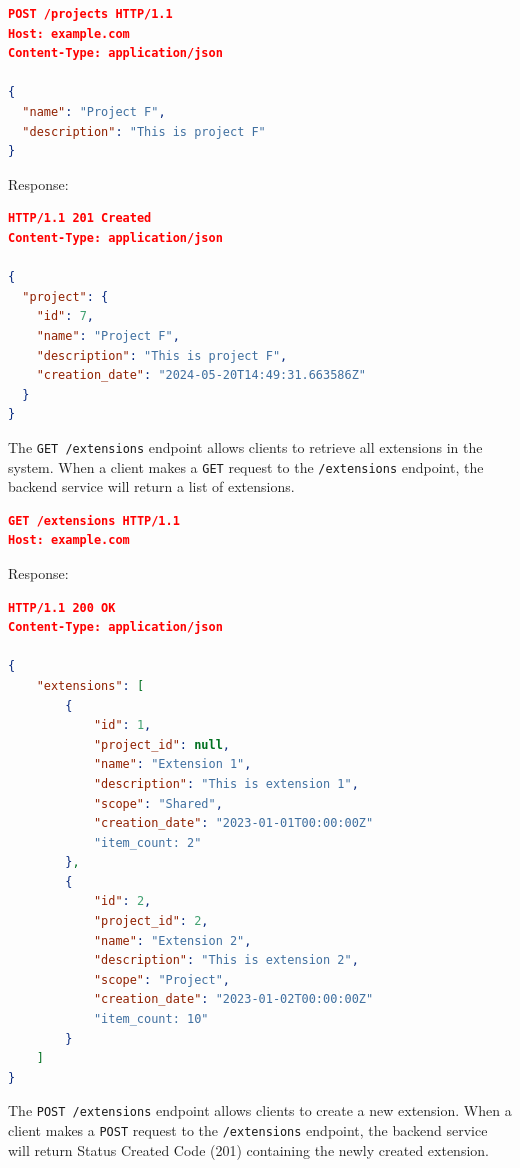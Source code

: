 \begin{lstlisting}[language=json,label={lst:lstlisting31}]
POST /projects HTTP/1.1
Host: example.com
Content-Type: application/json

{
  "name": "Project F",
  "description": "This is project F"
}
\end{lstlisting}

Response:

\begin{lstlisting}[language=json,label={lst:lstlisting32}]
HTTP/1.1 201 Created
Content-Type: application/json

{
  "project": {
    "id": 7,
    "name": "Project F",
    "description": "This is project F",
    "creation_date": "2024-05-20T14:49:31.663586Z"
  }
}
\end{lstlisting}


The \texttt{GET /extensions} endpoint allows clients to retrieve all extensions in the system.
When a client makes a \texttt{GET} request to the \texttt{/extensions} endpoint, the backend service will return a list of extensions.

\begin{lstlisting}[language=json,label={lst:lstlisting13}]
GET /extensions HTTP/1.1
Host: example.com
\end{lstlisting}

Response:

\begin{lstlisting}[language=json,label={lst:lstlisting23}]
HTTP/1.1 200 OK
Content-Type: application/json

{
    "extensions": [
        {
            "id": 1,
            "project_id": null,
            "name": "Extension 1",
            "description": "This is extension 1",
            "scope": "Shared",
            "creation_date": "2023-01-01T00:00:00Z"
            "item_count: 2"
        },
        {
            "id": 2,
            "project_id": 2,
            "name": "Extension 2",
            "description": "This is extension 2",
            "scope": "Project",
            "creation_date": "2023-01-02T00:00:00Z"
            "item_count: 10"
        }
    ]
}
\end{lstlisting}


The \texttt{POST /extensions} endpoint allows clients to create a new extension.
When a client makes a \texttt{POST} request to the \texttt{/extensions} endpoint, the backend service will return Status Created Code (201) containing the newly created extension.


